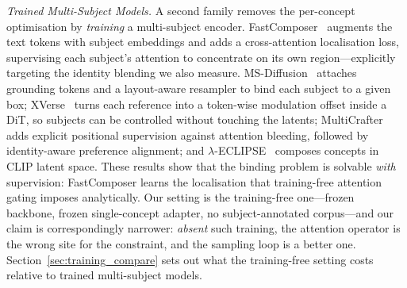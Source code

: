 \documentclass[review,10pt,times]{elsarticle}
\begin{document}
\noindent\textit{Trained Multi-Subject Models.}
A second family removes the per-concept optimisation by \emph{training} a
multi-subject encoder.  FastComposer~\cite{xiao2024fastcomposer}
augments the text tokens with subject embeddings and adds a
cross-attention localisation loss, supervising each subject's attention
to concentrate on its own region---explicitly targeting the identity
blending we also measure.  MS-Diffusion~\cite{wang2025msdiffusion}
attaches grounding tokens and a layout-aware resampler to bind each
subject to a given box; XVerse~\cite{chen2025xverse} turns each reference
into a token-wise modulation offset inside a DiT, so subjects can be
controlled without touching the latents; MultiCrafter~\cite{wu2026multicrafter}
adds explicit positional supervision against attention bleeding, followed by
identity-aware preference alignment; and
$\lambda$-ECLIPSE~\cite{patel2024lambda} composes concepts in CLIP
latent space.  These results show that the binding problem is solvable
\emph{with} supervision: FastComposer learns the localisation that
training-free attention gating imposes analytically.  Our setting is the
training-free one---frozen backbone, frozen single-concept adapter, no
subject-annotated corpus---and our claim is correspondingly narrower:
\emph{absent} such training, the attention operator is the wrong site for
the constraint, and the sampling loop is a better one.
Section~\ref{sec:training_compare} sets out what the training-free
setting costs relative to trained multi-subject models.
\end{document}
